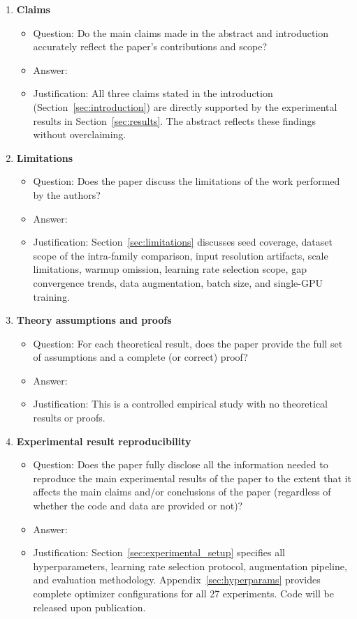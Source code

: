 \documentclass{article}
\begin{document}
\begin{enumerate}

\item {\bf Claims}
    \begin{itemize}
        \item[] Question: Do the main claims made in the abstract and introduction accurately reflect the paper's contributions and scope?
        \item[] Answer: \answerYes{}
        \item[] Justification: All three claims stated in the introduction (Section~\ref{sec:introduction}) are directly supported by the experimental results in Section~\ref{sec:results}. The abstract reflects these findings without overclaiming.
    \end{itemize}

\item {\bf Limitations}
    \begin{itemize}
        \item[] Question: Does the paper discuss the limitations of the work performed by the authors?
        \item[] Answer: \answerYes{}
        \item[] Justification: Section~\ref{sec:limitations} discusses seed coverage, dataset scope of the intra-family comparison, input resolution artifacts, scale limitations, warmup omission, learning rate selection scope, gap convergence trends, data augmentation, batch size, and single-GPU training.
    \end{itemize}

\item {\bf Theory assumptions and proofs}
    \begin{itemize}
        \item[] Question: For each theoretical result, does the paper provide the full set of assumptions and a complete (or correct) proof?
        \item[] Answer: \answerNA{}
        \item[] Justification: This is a controlled empirical study with no theoretical results or proofs.
    \end{itemize}

\item {\bf Experimental result reproducibility}
    \begin{itemize}
        \item[] Question: Does the paper fully disclose all the information needed to reproduce the main experimental results of the paper to the extent that it affects the main claims and/or conclusions of the paper (regardless of whether the code and data are provided or not)?
        \item[] Answer: \answerYes{}
        \item[] Justification: Section~\ref{sec:experimental_setup} specifies all hyperparameters, learning rate selection protocol, augmentation pipeline, and evaluation methodology. Appendix~\ref{sec:hyperparams} provides complete optimizer configurations for all 27 experiments. Code will be released upon publication.
    \end{itemize}


\end{enumerate}
\end{document}

